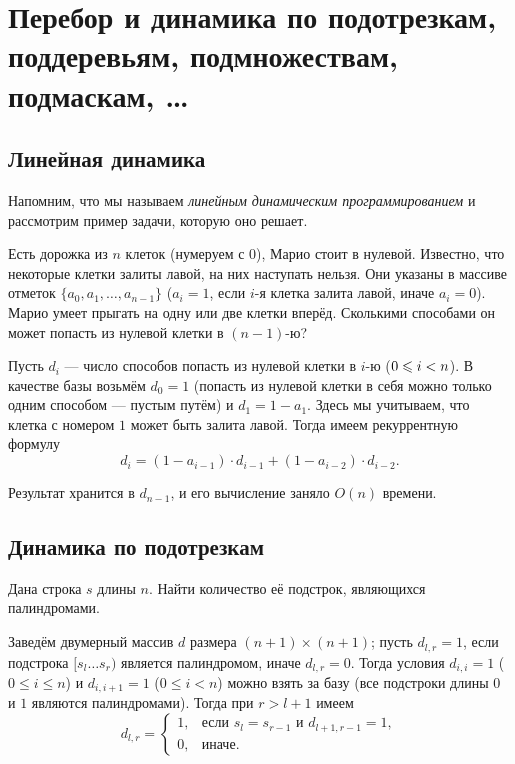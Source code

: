 \section{Перебор и динамика по подотрезкам, поддеревьям,
подмножествам, подмаскам, \ldots}

\subsection{Линейная динамика}

Напомним, что мы называем \textit{линейным динамическим программированием} и рассмотрим пример задачи, которую оно решает.

\begin{problem}
    Есть дорожка из $n$ клеток (нумеруем с $0$), Марио стоит в нулевой. Известно, что некоторые клетки залиты лавой, на них наступать нельзя. Они указаны в массиве отметок $\{a_0, a_1, \ldots, a_{n - 1}\}$ ($a_i = 1$, если $i$-я клетка залита лавой, иначе $a_i = 0$). Марио умеет прыгать на одну или две клетки вперёд. Сколькими способами он может попасть из нулевой клетки в $(n - 1)$-ю?
\end{problem}

Пусть $d_i$ --- число способов попасть из нулевой клетки в $i$-ю ($0 \leqslant i \hm < n$). В качестве базы возьмём $d_0 = 1$ (попасть из нулевой клетки в себя можно только одним способом --- пустым путём) и $d_1 = 1 - a_1$. Здесь мы учитываем, что клетка с номером $1$ может быть залита лавой. Тогда имеем рекуррентную формулу
\[
    d_i = (1 - a_{i - 1}) \cdot d_{i - 1} + (1 - a_{i - 2}) \cdot d_{i - 2}.
\]

Результат хранится в $d_{n - 1}$, и его вычисление заняло $O(n)$ времени.

\subsection{Динамика по подотрезкам}

\begin{problem}
    Дана строка $s$ длины $n$. Найти количество её подстрок, являющихся палиндромами.
\end{problem}

Заведём двумерный массив $d$ размера $(n + 1) \times (n + 1)$; пусть $d_{l, r} = 1$, если подстрока $[s_l\ldots s_r)$ является палиндромом, иначе $d_{l, r} = 0$. Тогда условия $d_{i, i} = 1$ ($0 \leqslant i \leqslant n$) и $d_{i, i + 1} = 1$ ($0 \leqslant i < n$) можно взять за базу (все подстроки длины $0$ и $1$ являются палиндромами). Тогда при $r > l + 1$ имеем
\[
    d_{l, r} =
    \begin{cases}
        1,&\text{если $s_l = s_{r - 1}$ и $d_{l + 1, r - 1} = 1$},\\
        0,&\text{иначе}.
    \end{cases}
\]

